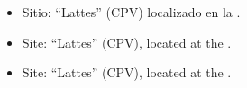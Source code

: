 \begin{itemize}
  \ifes
    \item Sitio: ``Lattes'' (CPV) localizado en la \institution. 
  \fi
  \ifen
    \item Site: ``Lattes'' (CPV), located at the \institution. 
  \fi
  \ifpt
    \item Site: ``Lattes'' (CPV), located at the \institution. 
  \fi
\end{itemize}
